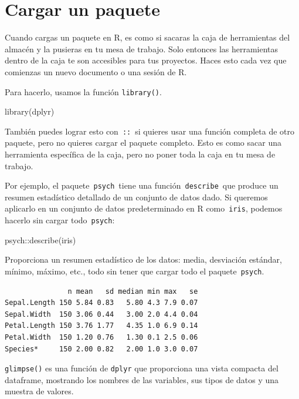 \documentclass[
  letterpaper,
  DIV=11,
  numbers=noendperiod,
  twoside]{scrreprt}
\newenvironment{Shaded}{\begin{snugshade}}{\end{snugshade}}
\newcommand{\FunctionTok}[1]{\textcolor[rgb]{0.28,0.35,0.67}{#1}}
\newcommand{\NormalTok}[1]{\textcolor[rgb]{0.00,0.23,0.31}{#1}}
\newcommand{\SpecialCharTok}[1]{\textcolor[rgb]{0.37,0.37,0.37}{#1}}
\begin{document}
\section{Cargar un paquete}\label{cargar-un-paquete}

Cuando cargas un paquete en R, es como si sacaras la caja de
herramientas del almacén y la pusieras en tu mesa de trabajo. Solo
entonces las herramientas dentro de la caja te son accesibles para tus
proyectos. Haces esto cada vez que comienzas un nuevo documento o una
sesión de R.

Para hacerlo, usamos la función \texttt{library()}.

\begin{Shaded}
\begin{Highlighting}[]
\FunctionTok{library}\NormalTok{(dplyr)}
\end{Highlighting}
\end{Shaded}

También puedes lograr esto con~\texttt{::}~si quieres usar una función
completa de otro paquete, pero no quieres cargar el paquete completo.
Esto es como sacar una herramienta específica de la caja, pero no poner
toda la caja en tu mesa de trabajo.

Por ejemplo, el paquete~\texttt{psych}~tiene una
función~\texttt{describe}~que produce un resumen estadístico detallado
de un conjunto de datos dado. Si queremos aplicarlo en un conjunto de
datos predeterminado en R como~\texttt{iris}, podemos hacerlo sin cargar
todo~\texttt{psych}:

\begin{Shaded}
\begin{Highlighting}[]
\NormalTok{psych}\SpecialCharTok{::}\FunctionTok{describe}\NormalTok{(iris)}
\end{Highlighting}
\end{Shaded}

Proporciona un resumen estadístico de los datos: media, desviación
estándar, mínimo, máximo, etc., todo sin tener que cargar todo el
paquete~\texttt{psych}.

\begin{verbatim}
               n mean   sd median min max   se
Sepal.Length 150 5.84 0.83   5.80 4.3 7.9 0.07
Sepal.Width  150 3.06 0.44   3.00 2.0 4.4 0.04
Petal.Length 150 3.76 1.77   4.35 1.0 6.9 0.14
Petal.Width  150 1.20 0.76   1.30 0.1 2.5 0.06
Species*     150 2.00 0.82   2.00 1.0 3.0 0.07
\end{verbatim}

\texttt{glimpse()} es una función de \texttt{dplyr} que proporciona una
vista compacta del dataframe, mostrando los nombres de las variables,
sus tipos de datos y una muestra de valores.
\end{document}
